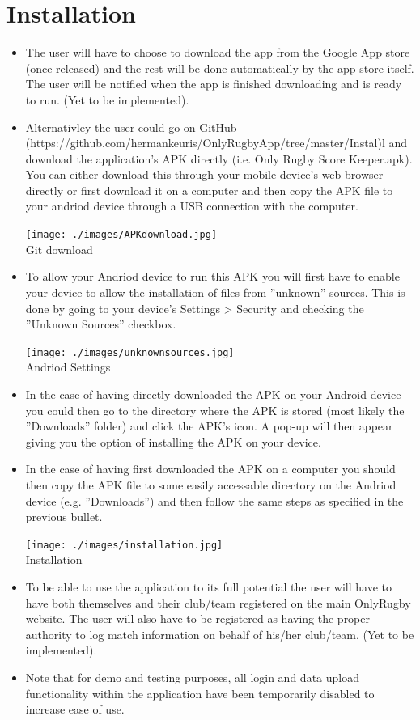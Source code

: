 \documentclass[hidelinks,a4paper,12pt]{article}
\begin{document}
\section{Installation}
\begin {itemize}
	\item The user will have to choose to download the app from the Google App store (once released) and the rest will be done automatically by the app store itself. The user will be notified when the app is finished downloading and is ready to run. (Yet to be implemented).
	\item Alternativley the user could go on GitHub (https://github.com/hermankeuris/OnlyRugbyApp/tree/master/Instal)l and download the application's APK directly (i.e. Only Rugby Score Keeper.apk). You can either download this through your mobile device's web browser directly or first download it on a computer and then copy the APK file to your andriod device through a USB connection with the computer.
	\begin{center}
  		 \texttt{[image: ./images/APKdownload.jpg]}\\[0.4cm]
  		 \caption{Git download}
	\end{center}
	\item To allow your Andriod device to run this APK you will first have to enable your device to allow the installation of files from ''unknown'' sources. This is done by going to your device's Settings > Security and checking the ''Unknown Sources'' checkbox.
	\begin{center}
  		 \texttt{[image: ./images/unknownsources.jpg]}\\[0.4cm]
  		 \caption{Andriod Settings}
	\end{center}
	\item In the case of having directly downloaded the APK on your Android device you could then go to the directory where the APK is stored (most likely the ''Downloads'' folder) and click the APK's icon. A pop-up will then appear giving you the option of installing the APK on your device.
	\item In the case of having first downloaded the APK on a computer you should then copy the APK file to some easily accessable directory on the Andriod device (e.g. ''Downloads'') and then follow the same steps as specified in the previous bullet.
	\begin{center}
  		 \texttt{[image: ./images/installation.jpg]}\\[0.4cm]
  		 \caption{Installation}
	\end{center}
	\item To be able to use the application to its full potential the user will have to have both themselves and their club/team registered on the main OnlyRugby website. The user will also have to be registered as having the proper authority to log match information on behalf of his/her club/team. (Yet to be implemented).
	\item Note that for demo and testing purposes, all login and data upload functionality within the application have been temporarily disabled to increase ease of use.
\end{itemize}
\end{document}
